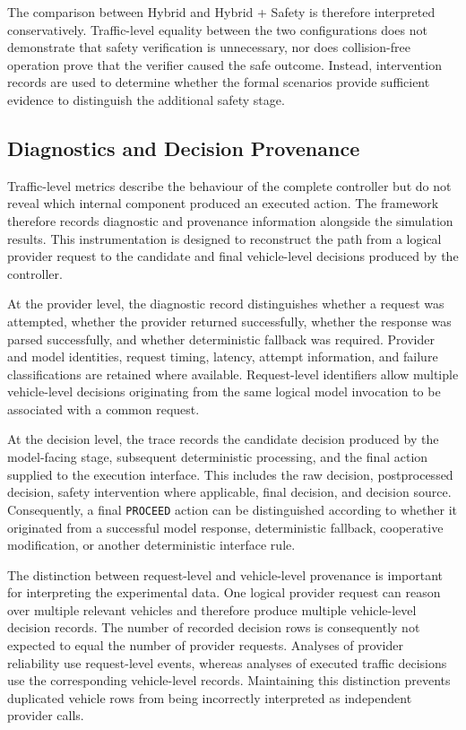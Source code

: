 \documentclass[letterpaper,10pt,conference]{ieeeconf}
\begin{document}
The comparison between Hybrid and Hybrid + Safety is therefore interpreted conservatively. Traffic-level equality between the two configurations does not demonstrate that safety verification is unnecessary, nor does collision-free operation prove that the verifier caused the safe outcome. Instead, intervention records are used to determine whether the formal scenarios provide sufficient evidence to distinguish the additional safety stage.



\subsection{Diagnostics and Decision Provenance}



Traffic-level metrics describe the behaviour of the complete controller but do not reveal which internal component produced an executed action. The framework therefore records diagnostic and provenance information alongside the simulation results. This instrumentation is designed to reconstruct the path from a logical provider request to the candidate and final vehicle-level decisions produced by the controller.



At the provider level, the diagnostic record distinguishes whether a request was attempted, whether the provider returned successfully, whether the response was parsed successfully, and whether deterministic fallback was required. Provider and model identities, request timing, latency, attempt information, and failure classifications are retained where available. Request-level identifiers allow multiple vehicle-level decisions originating from the same logical model invocation to be associated with a common request.



At the decision level, the trace records the candidate decision produced by the model-facing stage, subsequent deterministic processing, and the final action supplied to the execution interface. This includes the raw decision, postprocessed decision, safety intervention where applicable, final decision, and decision source. Consequently, a final \texttt{PROCEED} action can be distinguished according to whether it originated from a successful model response, deterministic fallback, cooperative modification, or another deterministic interface rule.



The distinction between request-level and vehicle-level provenance is important for interpreting the experimental data. One logical provider request can reason over multiple relevant vehicles and therefore produce multiple vehicle-level decision records. The number of recorded decision rows is consequently not expected to equal the number of provider requests. Analyses of provider reliability use request-level events, whereas analyses of executed traffic decisions use the corresponding vehicle-level records. Maintaining this distinction prevents duplicated vehicle rows from being incorrectly interpreted as independent provider calls.
\end{document}
